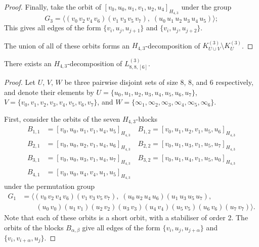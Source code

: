 \begin{subappendices}
\begin{proof}
Finally, take the orbit of $[v_0, u_0, u_1, v_1, u_2, u_4]_{H_{4,3}}$ under the group
\[
    G_3 = \langle (v_0 \, v_2 \, v_4 \, v_6) (v_1 \, v_3 \, v_5 \, v_7), \;
    (u_0 \, u_1 \, u_2 \, u_3 \, u_4 \, u_5) \rangle;
\]
This gives all edges of the form $\{v_i, u_j, u_{j+1}\}$ and $\{v_i, u_j, u_{j+2}\}$.

The union of all of these orbits forms an $H_{4,3}$-decomposition of $K_{U \cup
V}^{(3)} \setminus K_{U}^{(3)}$.
\end{proof}


\begin{example} \label{eg:H_43-l88-k886}
There exists an $H_{4,3}$-decomposition of $L_{8,8,[6]}^{(3)}$.
\end{example}

\begin{proof}
Let $U$, $V$, $W$ be three pairwise disjoint sets of size 8, 8, and 6 respectively, and denote their elements by
  $U = \{u_0, u_1, u_2, u_3, u_4, u_5, u_6, u_7\}$,
  $V = \{v_0, v_1, v_2, v_3, v_4, v_5, v_6, v_7\}$, and
  $W = \{\infty_1, \infty_2, \infty_3, \infty_4, \infty_5, \infty_6\}$.

First, consider the orbits of the seven $H_{4,3}$-blocks
\begin{align*}
    B_{1,1} &= [v_0, u_0, u_1, v_1, u_4, u_5]_{H_{4,3}} \quad
    B_{1,2} = [v_0, u_1, u_2, v_1, u_5, u_6]_{H_{4,3}} \\
    B_{2,1} &= [v_0, u_0, u_2, v_1, u_4, u_6]_{H_{4,3}} \quad
    B_{2,2} = [v_0, u_1, u_3, v_1, u_5, u_7]_{H_{4,3}} \\
    B_{3,1} &= [v_0, u_0, u_3, v_1, u_4, u_7]_{H_{4,3}} \quad
    B_{3,2} = [v_0, u_1, u_4, v_1, u_5, u_0]_{H_{4,3}} \\
    B_{4,1} &= [v_0, u_0, u_4, v_4, u_1, u_5]_{H_{4,3}}
\end{align*}
under the permutation group
\begin{align*}
    G_1 &= \langle (v_0 \, v_2 \, v_4 \, v_6) (v_1 \, v_3 \, v_5 \, v_7),
    \; (u_0 \, u_2 \, u_4 \, u_6) (u_1 \, u_3 \, u_5 \, u_7), \\
    & \quad \quad (u_0 \, v_0) (u_1 \, v_1) (u_2 \, v_2) (u_3 \, v_3) (u_4 \, v_4)
    (u_5 \, v_5) (u_6 \, v_6) (u_7 \, v_7) \rangle.
\end{align*}
Note that each of these orbits is a short orbit, with a stabiliser of order 2.
The orbits of the blocks $B_{\alpha,\beta}$ give all edges of the form $\{v_i, u_j, u_{j+\alpha}\}$ and $\{v_i, v_{i+\alpha}, u_j\}$.


\end{proof}
\end{subappendices}
